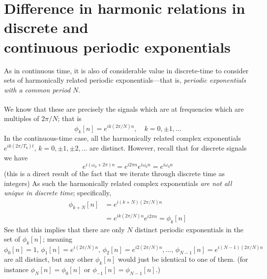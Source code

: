 \documentclass{report}
\begin{document}
\section{Difference in harmonic relations in discrete and\\continuous periodic exponentials}
As in continuous time, it is also of considerable value in discrete-time to consider sets of harmonically related
periodic exponentials---that is, \textit{periodic exponentials with a common period $N$}.\\
\vspace{1mm}\\
We know that these are precisely the signals which are at frequencies which are multiples of $2\pi/N$; that is
\begin{equation*}
\phi_k[n]=e^{ik(2\pi/N)n},\quad k=0,\pm1,\ldots
\end{equation*}
In the continuous-time case, all the harmonically related complex exponentials 
$e^{ik(2\pi/T_0)t},\,k=0,\pm1,\pm2,\ldots$ are distinct.
However, recall that for discrete signals we have
\begin{equation*}
e^{i(\omega_0+2\pi)n}=e^{i2\pi n}e^{i\omega_0n}=e^{i\omega_0n}
\end{equation*}
(this is a direct result of the fact that we iterate through discrete time as integers) As such the harmonically
related complex exponentials \textit{are not all unique in discrete time}; specifically,
\begin{align*}
\phi_{k+N}[n]&=e^{i(k+N)(2\pi/N)n}\\
&=e^{ik(2\pi/N)n}e^{i2\pi n}=\phi_k[n]
\end{align*}
See that this implies that there are only $N$ distinct 
periodic exponentials in the set of $\phi_k[n]$; meaning
\begin{equation*}
\phi_0[n]=1,\,\phi_1[n]=e^{i(2\pi/N)n},\,
\phi_2[n]=e^{i2(2\pi/N)n},\ldots,\,
\phi_{N-1}[n]=e^{i(N-1)(2\pi/N)n}
\end{equation*}
are all distinct, but any other $\phi_k[n]$ would just be identical to one of them. (for instance $\phi_N[n]=\phi_0[n]$ or $\phi_{-1}[n]=\phi_{N-1}[n]$.)
\newpage
\end{document}

